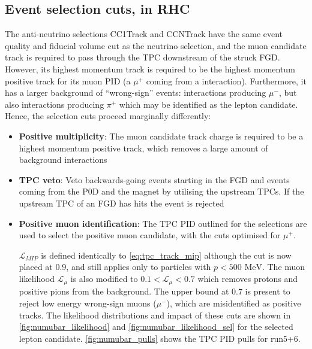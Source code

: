 \subsection{Event selection cuts, \numubar in RHC}
\label{sec:numubar_sel}
The anti-neutrino selections CC1Track and CCNTrack have the same event quality and fiducial volume cut as the neutrino selection, and the muon candidate track is required to pass through the TPC downstream of the struck FGD. However, its highest momentum track is required to be the highest momentum positive track for its muon PID (a $\mu^+$ coming from a \numubar interaction). Furthermore, it has a larger background of ``wrong-sign'' events: \numu interactions producing $\mu^-$, but also \numu interactions producing $\pi^+$ which may be identified as the lepton candidate. Hence, the selection cuts proceed marginally differently:
\begin{itemize}
	\item \textbf{Positive multiplicity}: The muon candidate track charge is required to be a highest momentum positive track, which removes a large amount of \numu background interactions
	
	\item \textbf{TPC veto}: Veto backwards-going events starting in the FGD and events coming from the P0D and the magnet by utilising the upstream TPCs. If the upstream TPC of an FGD has hits the event is rejected
	
	\item \textbf{Positive muon identification}: The TPC PID outlined for the \numu selections are used to select the positive muon candidate, with the cuts optimised for $\mu^+$. 
	
	$\mathcal{L}_{MIP}$ is defined identically to \autoref{eq:tpc_track_mip} although the cut is now placed at 0.9, and still applies only to particles with $p < 500\text{ MeV}$. The muon likelihood $\mathcal{L}_\mu$ is also modified to $0.1 < \mathcal{L}_\mu < 0.7$ which removes protons and positive pions from the \numu background. The upper bound at 0.7 is present to reject low energy wrong-sign muons ($\mu^-$), which are misidentified as positive tracks. The likelihood distributions and impact of these cuts are shown in \autoref{fig:numubar_likelihood} and \autoref{fig:numubar_likelihood_sel} for the selected lepton candidate. \autoref{fig:numubar_pulls} shows the TPC PID pulls for run5+6. 
\end{itemize}

